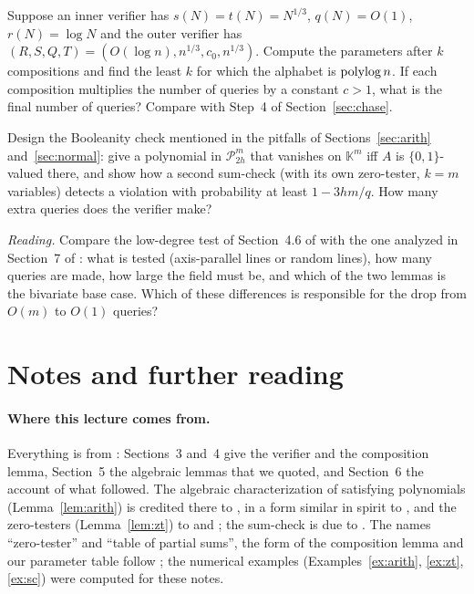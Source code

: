 \begin{exercise}[\stars{$\star\star$}]\label{ex:chase}
Suppose an inner verifier has $s(N)=t(N)=N^{1/3}$, $q(N)=O(1)$, $r(N)=\log N$ and the outer verifier has $(R,S,Q,T)=(O(\log n),n^{1/3},c_0,n^{1/3})$.  Compute the parameters after $k$ compositions
and find the least $k$ for which the alphabet is $\operatorname{polylog} n$.  If each composition multiplies the number of queries by a constant $c>1$, what is the final number of queries?  Compare with Step~4 of Section~\ref{sec:chase}.
\end{exercise}

\begin{exercise}[\stars{$\star\star$}]\label{ex:bool}
Design the Booleanity check mentioned in the pitfalls of Sections~\ref{sec:arith} and~\ref{sec:normal}: give a polynomial in $\mathcal P^{m}_{2h}$ that vanishes on $\mathbb K^m$ iff $A$ is $\{0,1\}$-valued
there, and show how a second sum-check (with its own zero-tester, $k=m$ variables) detects a violation with probability at least $1-3hm/q$.  How many extra queries does the verifier make?
\end{exercise}

\begin{exercise}[\stars{$\star\star\star$}]\label{ex:reading3}
\emph{Reading.}  Compare the low-degree test of Section~4.6 of \citet{AroraSafra98} with the one analyzed in Section~7 of \citet{ALMSS98}: what is tested (axis-parallel lines or random lines), how many queries
are made, how large the field must be, and which of the two lemmas is the bivariate base case.  Which of these differences is responsible for the drop from $O(m)$ to $O(1)$ queries?
\end{exercise}


\section*{Notes and further reading}

\paragraph{Where this lecture comes from.}
Everything is from \citet{AroraSafra98}: Sections~3 and~4 give the verifier and the composition lemma, Section~5 the algebraic lemmas that we quoted, and Section~6 the account of what followed.  The algebraic characterization of satisfying polynomials (Lemma~\ref{lem:arith}) is credited there to \citet{BFLS91}, in a form similar in spirit to \citet{BFL91}, and the zero-testers (Lemma~\ref{lem:zt}) to
\citet{BFLS91} and \citet{FGLSS96}; the sum-check is due to \citet{LFKN92}.  The names ``zero-tester'' and ``table of partial sums'', the form of the composition lemma
and our parameter table follow \citet{AroraSafra98}; the numerical examples (Examples~\ref{ex:arith}, \ref{ex:zt}, \ref{ex:sc}) were computed for these notes.

